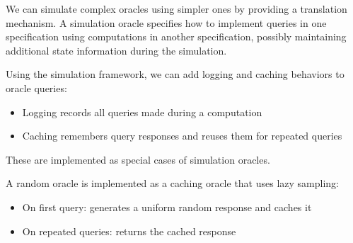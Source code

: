 \begin{definition}
    \label{def:sim_oracle}
    We can simulate complex oracles using simpler ones by providing a translation mechanism. 
    A simulation oracle specifies how to implement queries in one specification using computations 
    in another specification, possibly maintaining additional state information during the simulation.
\end{definition}

\begin{definition}
    \label{def:logging_caching_oracle_queries}
    Using the simulation framework, we can add logging and caching behaviors to oracle queries:
    \begin{itemize}
        \item Logging records all queries made during a computation
        \item Caching remembers query responses and reuses them for repeated queries
    \end{itemize}
    These are implemented as special cases of simulation oracles.
\end{definition}

\begin{definition}
    \label{def:random_oracle}
    A random oracle is implemented as a caching oracle that uses lazy sampling:
    \begin{itemize}
        \item On first query: generates a uniform random response and caches it
        \item On repeated queries: returns the cached response
    \end{itemize}
\end{definition}

